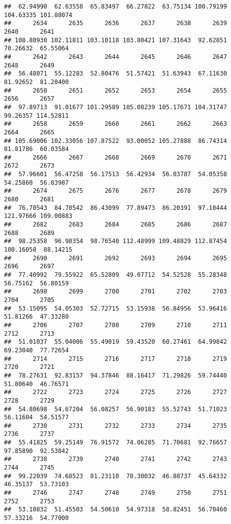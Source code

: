 \documentclass[
]{article}
\begin{document}
\begin{verbatim}
##  62.94990  62.63558  65.83497  66.27822  63.75134 100.79199 104.63335 101.88074 
##      2634      2635      2636      2637      2638      2639      2640      2641 
## 108.80930 102.11811 103.10118 103.80421 107.31643  92.62851  70.26632  65.55064 
##      2642      2643      2644      2645      2646      2647      2648      2649 
##  56.48071  55.12283  52.80476  51.57421  51.63943  67.11630  81.92652  81.20400 
##      2650      2651      2652      2653      2654      2655      2656      2657 
##  97.89713  91.01677 101.29589 105.08239 105.17671 104.31747  99.26357 114.52811 
##      2658      2659      2660      2661      2662      2663      2664      2665 
## 105.69006 102.33056 107.87522  93.00052 105.27888  86.74314  81.81786  60.03584 
##      2666      2667      2668      2669      2670      2671      2672      2673 
##  57.96601  56.47258  56.17513  56.42934  56.03787  54.05358  54.25860  56.83987 
##      2674      2675      2676      2677      2678      2679      2680      2681 
##  76.70543  84.70542  86.43099  77.89473  86.20391  97.10444 121.97666 109.00883 
##      2682      2683      2684      2685      2686      2687      2688      2689 
##  98.25358  96.98354  98.76540 112.48999 109.48829 112.87454 100.16058  88.14215 
##      2690      2691      2692      2693      2694      2695      2696      2697 
##  77.40992  79.55922  65.52809  49.07712  54.52528  55.28348  56.75162  56.80159 
##      2698      2699      2700      2701      2702      2703      2704      2705 
##  53.15095  54.05303  52.72715  53.15938  56.84956  53.96416  51.81266  47.33280 
##      2706      2707      2708      2709      2710      2711      2712      2713 
##  51.01037  55.04006  55.49019  59.43520  60.27461  64.99842  69.23040  77.72654 
##      2714      2715      2716      2717      2718      2719      2720      2721 
##  78.27631  92.83157  94.37846  88.16417  71.29826  59.74440  51.80640  46.76571 
##      2722      2723      2724      2725      2726      2727      2728      2729 
##  54.80698  54.67204  56.08257  56.90183  55.52743  51.71023  56.11604  54.51577 
##      2730      2731      2732      2733      2734      2735      2736      2737 
##  55.41825  59.25149  76.91572  74.06285  71.70681  92.76657  97.85890  92.53842 
##      2738      2739      2740      2741      2742      2743      2744      2745 
##  99.22039  74.68523  81.23110  70.30032  46.88737  45.64332  46.35137  53.73103 
##      2746      2747      2748      2749      2750      2751      2752      2753 
##  53.10832  51.45503  54.50610  54.97318  58.82451  56.70460  57.33216  54.77000 

\end{verbatim}
\end{document}
